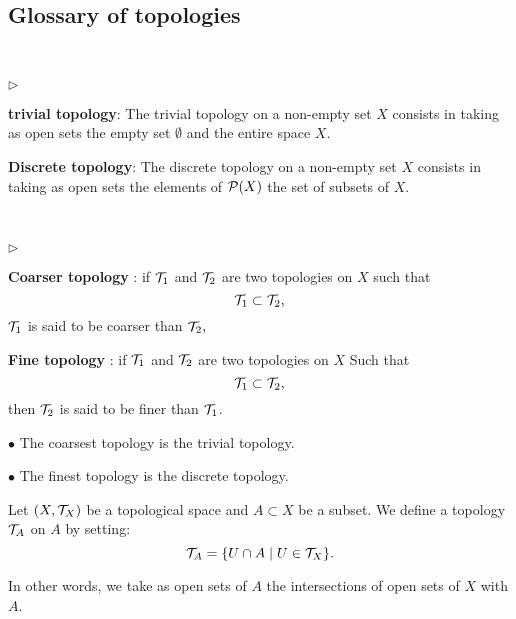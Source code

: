 \subsection{Glossary of topologies}
\begin{definition}

\

\begin{list}{$\triangleright$}{}
\item {\bf trivial topology}: The trivial topology on a non-empty set $X$ consists in taking as open sets the empty set $\emptyset$ and the entire space $X.$
\item {\bf Discrete topology}: The discrete topology on a non-empty set $X$ consists in taking as open sets the elements of $\mathcal{P}(X)$ the set of subsets of $X.$
\end{list}
\end{definition}

\begin{definition}

\

\begin{list}{$\triangleright$}{}

\item {\bf Coarser topology} : if $\mathcal{T}_{1}$ and $\mathcal{T}_{2}$ are two topologies on $X$ such that $$\mathcal{T}_{1}\subset \mathcal{T}_{2},$$ $\mathcal{T}_{1}$ is said to be coarser than $\mathcal{T}_{2},$
\item {\bf Fine topology} : if $\mathcal{T}_{1}$ and $\mathcal{T}_{2}$ are two topologies on $X$ Such that $$\mathcal{T}_{1}\subset \mathcal{T}_{2},$$ then $\mathcal{T}_{2}$ is said to be finer than $\mathcal{T}_{1}$.
\end{list}
\end{definition}

\noindent $\bullet$ The coarsest topology is the trivial topology.

\noindent $\bullet$ The finest topology is the discrete topology.

\begin{definition}
Let $(X, \mathcal{T}_{X })$ be a topological space and $A \subset X$ be a subset. We define a topology $ \mathcal{T}_{A}$ on $A$ by setting:
\[
\mathcal{T}_{A}=\{U\cap A\mid U\in \mathcal{T}_{X}\} .
\]
\end{definition}

In other words, we take as open sets of $A$ the intersections of open sets of $X$ with $A$.

